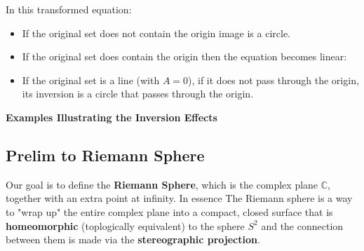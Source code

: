 \documentclass[a4paper, 10pt]{article}
\begin{document}
\noindent In this transformed equation:
\begin{itemize}
  \item If the original set does not contain the origin  image is a circle.
  \item If the original set does contain the origin then the equation becomes linear:

  \item If the original set is a line (with \(A=0\)), if it does not pass through the origin, its inversion is a circle that passes through the origin.
\end{itemize}
\noindent\textbf{Examples Illustrating the Inversion Effects} \\
\pagebreak
\subsection{Prelim to Riemann Sphere}
Our goal is to define the  \textbf{Riemann Sphere}, which is the complex plane $\mathbb{C}$, together with an extra point at infinity. In essence
The Riemann sphere is a way to "wrap  up" the entire complex plane into a compact, closed surface that is \textbf{homeomorphic} (toplogically equivalent) to the sphere $S^2$ and the connection between them is made via the \textbf{stereographic projection}.
\end{document}

